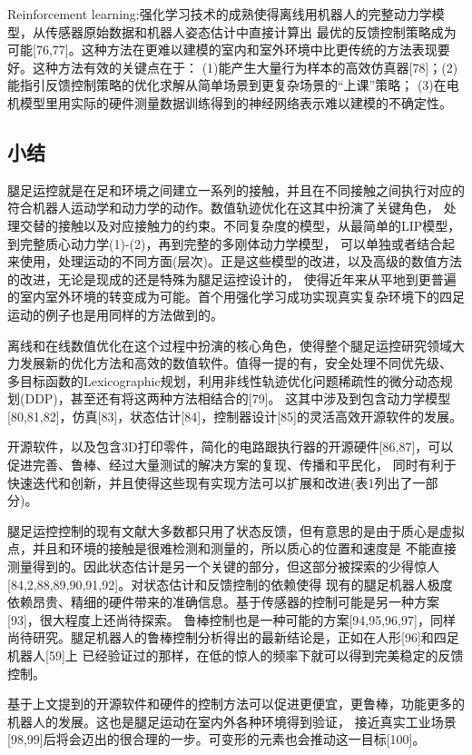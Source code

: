Reinforcement learning:强化学习技术的成熟使得离线用机器人的完整动力学模型，从传感器原始数据和机器人姿态估计中直接计算出
最优的反馈控制策略成为可能[76,77]。这种方法在更难以建模的室内和室外环境中比更传统的方法表现要好。这种方法有效的关键点在于：
(1)能产生大量行为样本的高效仿真器[78]；(2)能指引反馈控制策略的优化求解从简单场景到更复杂场景的“上课”策略；
(3)在电机模型里用实际的硬件测量数据训练得到的神经网络表示难以建模的不确定性。

\subsection{小结}
腿足运控就是在足和环境之间建立一系列的接触，并且在不同接触之间执行对应的符合机器人运动学和动力学的动作。数值轨迹优化在这其中扮演了关键角色，
处理交替的接触以及对应接触力的约束。不同复杂度的模型，从最简单的LIP模型，到完整质心动力学(1)-(2)，再到完整的多刚体动力学模型，
可以单独或者结合起来使用，处理运动的不同方面(层次)。正是这些模型的改进，以及高级的数值方法的改进，无论是现成的还是特殊为腿足运控设计的，
使得近年来从平地到更普遍的室内室外环境的转变成为可能。首个用强化学习成功实现真实复杂环境下的四足运动的例子也是用同样的方法做到的。

离线和在线数值优化在这个过程中扮演的核心角色，使得整个腿足运控研究领域大力发展新的优化方法和高效的数值软件。值得一提的有，安全处理不同优先级、
多目标函数的Lexicographic规划，利用非线性轨迹优化问题稀疏性的微分动态规划(DDP)，甚至还有将这两种方法相结合的[79]。
这其中涉及到包含动力学模型[80,81,82]，仿真[83]，状态估计[84]，控制器设计[85]的灵活高效开源软件的发展。

开源软件，以及包含3D打印零件，简化的电路跟执行器的开源硬件[86,87]，可以促进完善、鲁棒、经过大量测试的解决方案的复现、传播和平民化，
同时有利于快速迭代和创新，并且使得这些现有实现方法可以扩展和改进(表1列出了一部分)。

腿足运控控制的现有文献大多数都只用了状态反馈，但有意思的是由于质心是虚拟点，并且和环境的接触是很难检测和测量的，所以质心的位置和速度是
不能直接测量得到的。因此状态估计是另一个关键的部分，但这部分被探索的少得惊人[84,2,88,89,90,91,92]。对状态估计和反馈控制的依赖使得
现有的腿足机器人极度依赖昂贵、精细的硬件带来的准确信息。基于传感器的控制可能是另一种方案[93]，很大程度上还尚待探索。
鲁棒控制也是一种可能的方案[94,95,96,97]，同样尚待研究。腿足机器人的鲁棒控制分析得出的最新结论是，正如在人形[96]和四足机器人[59]上
已经验证过的那样，在低的惊人的频率下就可以得到完美稳定的反馈控制。

基于上文提到的开源软件和硬件的控制方法可以促进更便宜，更鲁棒，功能更多的机器人的发展。这也是腿足运动在室内外各种环境得到验证，
接近真实工业场景[98,99]后将会迈出的很合理的一步。可变形的元素也会推动这一目标[100]。


